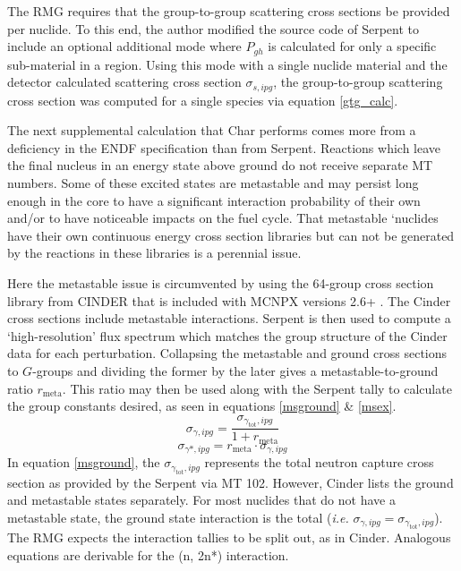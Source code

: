 The RMG requires that the group-to-group scattering cross sections be provided 
per nuclide. To this end, the author modified the source code of Serpent to include an optional 
additional mode where $P_{gh}$ is calculated for only a specific sub-material in a region.    
Using this mode with a single nuclide material and the detector calculated
scattering cross section $\sigma_{s,ipg}$, the group-to-group scattering cross section was computed 
for a single species via equation \ref{gtg_calc}.

The next supplemental calculation that Char performs comes more from a deficiency in the 
ENDF specification than from Serpent.  Reactions which leave the final nucleus in an energy
state above ground do not receive separate MT numbers.  Some of these excited states
are metastable and may persist long enough in the core to have a significant interaction 
probability of their own and/or to have noticeable impacts on the fuel cycle. That metastable 
`nuclides have their own continuous energy cross section libraries
but can not be generated by the reactions in these libraries is a perennial issue.

Here the metastable issue is circumvented by using the 64-group cross section library from CINDER that is 
included with MCNPX versions 2.6+ \cite{Pelowitz2008}.  The Cinder cross sections include metastable
interactions.  Serpent is then used to compute a `high-resolution' 
flux spectrum which matches the group structure of the Cinder data for each perturbation.  
Collapsing the metastable and ground cross sections to $G$-groups and dividing the former by 
the later gives a metastable-to-ground ratio $r_{\mbox{meta}}$.  This ratio may then be used along with 
the Serpent tally to calculate the group constants desired, as seen in equations \ref{msground} \& 
\ref{msex}.
\begin{equation}
\label{msground}
\sigma_{\gamma,ipg} = \frac{\sigma_{\gamma_{\mbox{tot}},ipg}}{1 + r_{\mbox{meta}}}
\end{equation}
\begin{equation}
\label{msex}
\sigma_{\gamma*,ipg} = r_{\mbox{meta}} \cdot \sigma_{\gamma,ipg}
\end{equation}
In equation \ref{msground}, the $\sigma_{\gamma_{\mbox{tot}},ipg}$ represents the total neutron
capture cross section as provided by the Serpent via MT 102.  However, Cinder 
lists the ground and metastable states separately.  For most nuclides that do not have a metastable state, the 
ground state interaction is the total (\emph{i.e.} $\sigma_{\gamma,ipg} = \sigma_{\gamma_{\mbox{tot}},ipg}$).
The RMG expects the interaction tallies to be split out, as in Cinder.  Analogous equations are 
derivable for the (n, 2n*) interaction.


